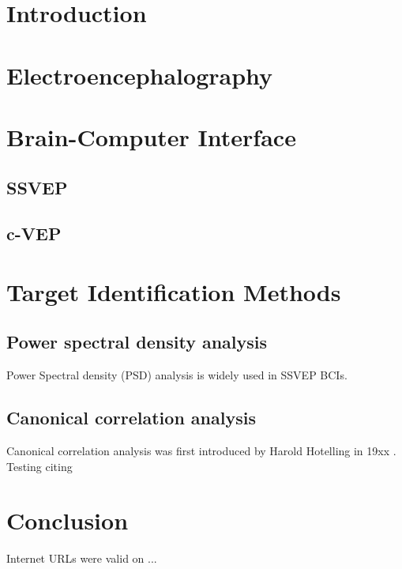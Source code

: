 \documentclass[a4paper,12pt]{report}
\begin{document}
\tableofcontents

\chapter*{Introduction}
\chapter{Electroencephalography}
\chapter{Brain-Computer Interface}
\section{SSVEP}
\section{c-VEP}
\chapter{Target Identification Methods}
\section{Power spectral density analysis}
Power Spectral density (PSD) analysis is widely used in SSVEP BCIs\cite{bin2009cca}.
\section{Canonical correlation analysis}
Canonical correlation analysis was first introduced by Harold Hotelling in 19xx . Testing citing\cite{scipy}\cite{scikit-learn}\cite{psychopy}
\chapter*{Conclusion}




Internet URLs were valid on ...

\end{document}

